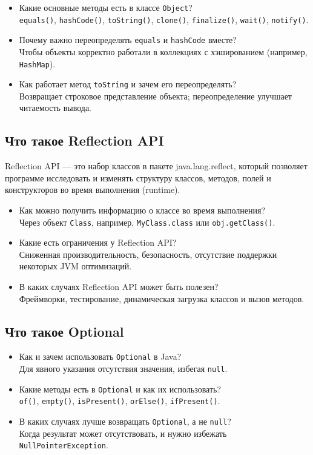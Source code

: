 \documentclass[a4paper,14pt]{article}
\begin{document}
\begin{itemize}
    \item Какие основные методы есть в классе \texttt{Object}? \\
    \texttt{equals()}, \texttt{hashCode()}, \texttt{toString()}, \texttt{clone()}, \texttt{finalize()}, \texttt{wait()}, \texttt{notify()}.
    \item Почему важно переопределять \texttt{equals} и \texttt{hashCode} вместе? \\
    Чтобы объекты корректно работали в коллекциях с хэшированием (например, \texttt{HashMap}).
    \item Как работает метод \texttt{toString} и зачем его переопределять? \\
    Возвращает строковое представление объекта; переопределение улучшает читаемость вывода.
\end{itemize}

\subsection{Что такое Reflection API}
\begin{Def}
    Reflection API — это набор классов в пакете java.lang.reflect, который позволяет программе исследовать и изменять структуру классов, методов, полей и конструкторов во время выполнения (runtime).
\end{Def}
\begin{itemize}
    \item Как можно получить информацию о классе во время выполнения? \\
    Через объект \texttt{Class}, например, \texttt{MyClass.class} или \texttt{obj.getClass()}.
    \item Какие есть ограничения у Reflection API? \\
    Сниженная производительность, безопасность, отсутствие поддержки некоторых JVM оптимизаций.
    \item В каких случаях Reflection API может быть полезен? \\
    Фреймворки, тестирование, динамическая загрузка классов и вызов методов.
\end{itemize}

\subsection{Что такое Optional}

\begin{itemize}
    \item Как и зачем использовать \texttt{Optional} в Java? \\
    Для явного указания отсутствия значения, избегая \texttt{null}.
    \item Какие методы есть в \texttt{Optional} и как их использовать? \\
    \texttt{of()}, \texttt{empty()}, \texttt{isPresent()}, \texttt{orElse()}, \texttt{ifPresent()}.
    \item В каких случаях лучше возвращать \texttt{Optional}, а не \texttt{null}? \\
    Когда результат может отсутствовать, и нужно избежать \texttt{NullPointerException}.
\end{itemize}
\end{document}
